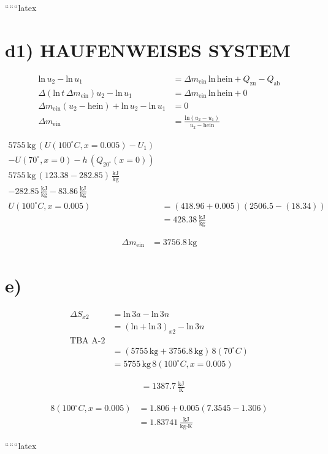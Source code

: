 ``````latex


\section*{d1) HAUFENWEISES SYSTEM}

\begin{align*}
    \text{ln} \, u_2 - \text{ln} \, u_1 &= \Delta m_{\text{ein}} \, \text{ln} \, \text{hein} + Q_{\text{zu}} - Q_{\text{ab}} \\
    \Delta (\text{ln} \, t \, \Delta m_{\text{ein}}) u_2 - \text{ln} \, u_1 &= \Delta m_{\text{ein}} \, \text{ln} \, \text{hein} + 0 \\
    \Delta m_{\text{ein}} (u_2 - \text{hein}) + \text{ln} \, u_2 - \text{ln} \, u_1 &= 0 \\
    \Delta m_{\text{ein}} &= \frac{\text{ln} (u_2 - u_1)}{u_2 - \text{hein}}
\end{align*}

\begin{align*}
    5755 \, \text{kg} \, (U(100^\circ C, x=0.005) - U_1) & \\
    - U(70^\circ, x=0) - h \, (Q_{20^\circ} (x=0)) & \\
    5755 \, \text{kg} \, (123.38 - 282.85) \, \frac{\text{kJ}}{\text{kg}} & \\
    - 282.85 \, \frac{\text{kJ}}{\text{kg}} - 83.86 \, \frac{\text{kJ}}{\text{kg}} & \\
    U(100^\circ C, x=0.005) &= (418.96 + 0.005) (2506.5 - (18.34)) \\
    &= 428.38 \, \frac{\text{kJ}}{\text{kg}}
\end{align*}

\begin{align*}
    \Delta m_{\text{ein}} &= 3756.8 \, \text{kg}
\end{align*}

\section*{e)}
\begin{align*}
    \Delta S_{x2} &= \text{ln} \, 3a - \text{ln} \, 3n \\
    &= (\text{ln} + \text{ln} \, 3)_{x2} - \text{ln} \, 3n \\
    \text{TBA A-2} \\
    &= (5755 \, \text{kg} + 3756.8 \, \text{kg}) \, 8(70^\circ C) \\
    &= 5755 \, \text{kg} \, 8(100^\circ C, x=0.005)
\end{align*}

\begin{align*}
    &= 1387.7 \, \frac{\text{kJ}}{\text{K}}
\end{align*}

\begin{align*}
    8(100^\circ C, x=0.005) &= 1.806 + 0.005 (7.3545 - 1.306) \\
    &= 1.83741 \, \frac{\text{kJ}}{\text{kg} \cdot \text{K}}
\end{align*}

``````latex



